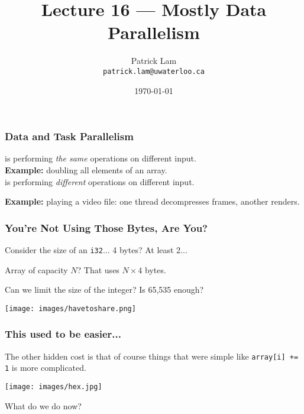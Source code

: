 

\title{Lecture 16 --- Mostly Data Parallelism }

\author{Patrick Lam \\ \small \texttt{patrick.lam@uwaterloo.ca}}
\date{\today}




\begin{frame}
  \titlepage

 \end{frame}


\begin{frame}
  \frametitle{Data and Task Parallelism}

  
      is performing \emph{the same} operations on
      different input.\\

     {\bf Example:} doubling all elements of an array.\\[1em]

      is performing \emph{different} operations
      on different input.

    {\bf Example:} playing a video file: one thread decompresses
      frames, another renders.

  
\end{frame}


\begin{frame}
\frametitle{You're Not Using Those Bytes, Are You?}

Consider the size of an \texttt{i32}... 4 bytes? At least 2...

Array of capacity $N$? That uses $N \times 4$ bytes.

Can we limit the size of the integer? Is 65,535 enough?

\begin{center}
	\texttt{[image: images/havetoshare.png]}
\end{center}

\end{frame}


\begin{frame}
\frametitle{This used to be easier...}

The other hidden cost is that of course things that were simple like \texttt{array[i] += 1} is more complicated. 

\begin{center}
	\texttt{[image: images/hex.jpg]}
\end{center}

What do we do now?

\end{frame}


